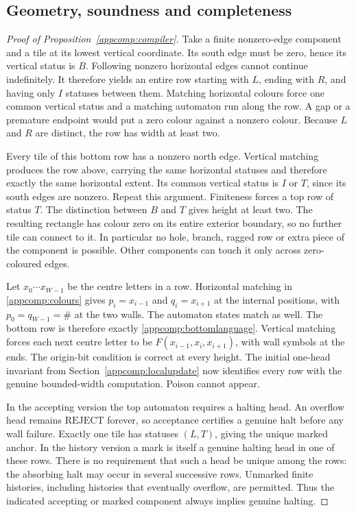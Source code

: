 \documentclass[11pt,reqno]{amsart}
\numberwithin{equation}{section}
\theoremstyle{definition}
\theoremstyle{remark}
\begin{document}
\subsection{Geometry, soundness and completeness}
\label{appcomp:proof}

\begin{proof}[Proof of Proposition~\ref{appcomp:compiler}]
Take a finite nonzero-edge component and a tile at its lowest vertical
coordinate.  Its south edge must be zero, hence its vertical status is
$B$.  Following nonzero horizontal edges cannot continue indefinitely.
It therefore yields an entire row starting with $L$, ending with $R$,
and having only $I$ statuses between them.  Matching horizontal colours
force one common vertical status and a matching automaton run along
the row.  A gap or a premature endpoint would put a zero colour against
a nonzero colour.  Because $L$ and $R$ are distinct, the row has width
at least two.

Every tile of this bottom row has a nonzero north edge.  Vertical
matching produces the row above, carrying the same horizontal statuses
and therefore exactly the same horizontal extent.  Its common vertical
status is $I$ or $T$, since its south edges are nonzero.  Repeat this
argument.  Finiteness forces a top row of status $T$.  The distinction
between $B$ and $T$ gives height at least two.  The resulting rectangle
has colour zero on its entire exterior boundary, so no further tile
can connect to it.  In particular no hole, branch, ragged row or extra
piece of the component is possible.  Other components can touch it
only across zero-coloured edges.

Let $x_0\cdots x_{W-1}$ be the centre letters in a row.  Horizontal
matching in \eqref{appcomp:colours} gives
$p_i=x_{i-1}$ and $q_i=x_{i+1}$ at the internal positions, with
$p_0=q_{W-1}=\#$ at the two walls.  The automaton states match as well.
The bottom row is therefore exactly \eqref{appcomp:bottomlanguage}.
Vertical matching forces each next centre letter to be
$F(x_{i-1},x_i,x_{i+1})$, with wall symbols at the ends.  The origin-bit
condition is correct at every height.  The initial one-head invariant
from Section~\ref{appcomp:localupdate} now identifies every row with
the genuine bounded-width computation.  Poison cannot appear.

In the accepting version the top automaton requires a halting head.
An overflow head remains $\mathrm{REJECT}$ forever, so acceptance
certifies a genuine halt before any wall failure.  Exactly one tile
has statuses $(L,T)$, giving the unique marked anchor.  In the history
version a mark is itself a genuine halting head in one of these rows.
There is no requirement that such a head be unique among the rows:
the absorbing halt may occur in several successive rows.  Unmarked
finite histories, including histories that eventually overflow, are
permitted.  Thus the indicated accepting or marked component always
implies genuine halting.


\end{proof}
\end{document}
